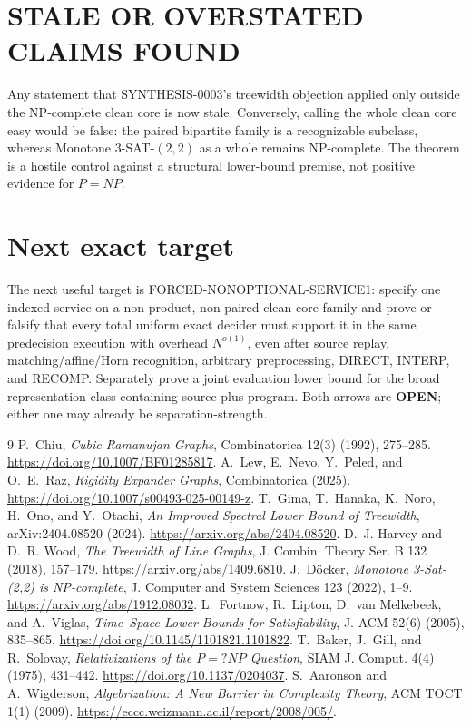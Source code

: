 \documentclass[11pt]{article}
\newcommand{\status}[1]{\textbf{#1}}
\begin{document}
\section{STALE OR OVERSTATED CLAIMS FOUND}
Any statement that SYNTHESIS-0003's treewidth objection applied only outside
the NP-complete clean core is now stale.  Conversely, calling the whole clean
core easy would be false: the paired bipartite family is a recognizable
subclass, whereas Monotone $3$-SAT-$(2,2)$ as a whole remains NP-complete.
The theorem is a hostile control against a structural lower-bound premise,
not positive evidence for $P=NP$.

\section{Next exact target}
The next useful target is \textsf{FORCED-NONOPTIONAL-SERVICE1}: specify one
indexed service on a non-product, non-paired clean-core family and prove or
falsify that every total uniform exact decider must support it in the same
predecision execution with overhead $N^{o(1)}$, even after source replay,
matching/affine/Horn recognition, arbitrary preprocessing, DIRECT, INTERP,
and RECOMP.  Separately prove a joint evaluation lower bound for the broad
representation class containing source plus program.  Both arrows are
\status{OPEN}; either one may already be separation-strength.

\begin{thebibliography}{9}
P.~Chiu, \emph{Cubic Ramanujan Graphs}, Combinatorica 12(3) (1992),
275--285. \url{https://doi.org/10.1007/BF01285817}.
A.~Lew, E.~Nevo, Y.~Peled, and O.~E.~Raz, \emph{Rigidity Expander Graphs},
Combinatorica (2025). \url{https://doi.org/10.1007/s00493-025-00149-z}.
T.~Gima, T.~Hanaka, K.~Noro, H.~Ono, and Y.~Otachi,
\emph{An Improved Spectral Lower Bound of Treewidth}, arXiv:2404.08520
(2024). \url{https://arxiv.org/abs/2404.08520}.
D.~J. Harvey and D.~R. Wood, \emph{The Treewidth of Line Graphs},
J. Combin. Theory Ser. B 132 (2018), 157--179.
\url{https://arxiv.org/abs/1409.6810}.
J.~D\"ocker, \emph{Monotone 3-Sat-(2,2) is NP-complete},
J. Computer and System Sciences 123 (2022), 1--9.
\url{https://arxiv.org/abs/1912.08032}.
L.~Fortnow, R.~Lipton, D.~van Melkebeek, and A.~Viglas,
\emph{Time--Space Lower Bounds for Satisfiability}, J. ACM 52(6) (2005),
835--865. \url{https://doi.org/10.1145/1101821.1101822}.
T.~Baker, J.~Gill, and R.~Solovay,
\emph{Relativizations of the $P=?NP$ Question}, SIAM J. Comput. 4(4)
(1975), 431--442. \url{https://doi.org/10.1137/0204037}.
S.~Aaronson and A.~Wigderson, \emph{Algebrization: A New Barrier in
Complexity Theory}, ACM TOCT 1(1) (2009).
\url{https://eccc.weizmann.ac.il/report/2008/005/}.
\end{thebibliography}
\end{document}
